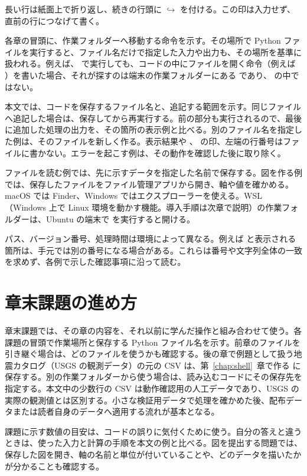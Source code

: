 長い行は紙面上で折り返し、続きの行頭に \(\hookrightarrow\) を付ける。この印は入力せず、直前の行につなげて書く。

各章の冒頭に、作業フォルダーへ移動する命令を示す。その場所で Python ファイルを実行すると、ファイル名だけで指定した入力や出力も、その場所を基準に扱われる。例えば、 で実行しても、コードの中にファイルを開く命令（例えば ）を書いた場合、それが探すのは端末の作業フォルダーにある  であり、 の中ではない。

本文では、コードを保存するファイル名と、追記する範囲を示す。同じファイルへ追記した場合は、保存してから再実行する。前の部分も実行されるので、最後に追加した処理の出力を、その箇所の表示例と比べる。別のファイル名を指定した例は、そのファイルを新しく作る。表示結果や \code{\$}、\code{>>>} の印、左端の行番号はファイルに書かない。エラーを起こす例は、その動作を確認した後に取り除く。

ファイルを読む例では、先に示すデータを指定した名前で保存する。図を作る例では、保存したファイルをファイル管理アプリから開き、軸や値を確かめる。macOS では Finder、Windows ではエクスプローラーを使える。WSL（Windows 上で Linux 環境を動かす機能。導入手順は次章で説明）の作業フォルダーは、Ubuntu の端末で  を実行すると開ける。

パス、バージョン番号、処理時間は環境によって異なる。例えば  と表示される箇所は、手元では別の番号になる場合がある。これらは番号や文字列全体の一致を求めず、各例で示した確認事項に沿って読む。

\section{章末課題の進め方}

章末課題では、その章の内容を、それ以前に学んだ操作と組み合わせて使う。各課題の冒頭で作業場所と保存する Python ファイル名を示す。前章のファイルを引き継ぐ場合は、どのファイルを使うかも確認する。後の章で例題として扱う地震カタログ（USGS の観測データ）の元の CSV は、第~\ref{chap:shell}~章で作る  に保存する。別の作業フォルダーから使う場合は、読み込むコードにその保存先を指定する。本文中の少数行の CSV は動作確認用の人工データであり、USGS の実際の観測値とは区別する。小さな検証用データで処理を確かめた後、配布データまたは読者自身のデータへ適用する流れが基本となる。

課題に示す数値の目安は、コードの誤りに気付くために使う。自分の答えと違うときは、使った入力と計算の手順を本文の例と比べる。図を提出する問題では、保存した図を開き、軸の名前と単位が付いていることや、どのデータを描いたかが分かることも確認する。

